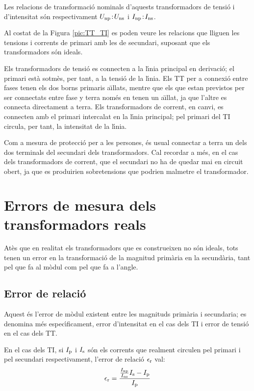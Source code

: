 Les relacions de transformaci\'{o} nominals d'aquests transformadors de
tensi\'{o} i d'intensitat s\'{o}n respectivament $U_\mathrm{np}\!:\!U_\mathrm{ns}$ i
$I_\mathrm{np}\!:\!I_\mathrm{ns}$.

Al costat de la Figura
\vref{pic:TT_TI} es poden veure les relacions que lliguen les
tensions i corrents de primari amb les de secundari, suposant que
els transformadors s\'{o}n ideals.


Els transformadors de tensi\'{o} es connecten a la l\'{\i}nia principal en
derivaci\'{o}; el  primari est\`{a} sotm\`{e}s, per tant, a la tensi\'{o} de la
l\'{\i}nia. Els TT per a connexi\'{o} entre fases tenen els dos borns
primaris a\"{\i}llats, mentre que els que estan previstos per ser
connectats entre fase y terra nom\'{e}s en tenen un a\"{\i}llat, ja que
l'altre es connecta directament a terra. Els transformadors de
corrent, en canvi, es connecten amb el primari intercalat en la
l\'{\i}nia principal;  pel primari del TI circula, per tant, la
intensitat de la l\'{\i}nia.

 Com a mesura de protecci\'{o} per a les persones, \'{e}s usual
connectar a terra un dels dos terminals del secundari dels
transformadors. Cal recordar a m\'{e}s, en el cas dels transformadors de
corrent, que el secundari no ha de quedar mai en circuit obert, ja
que es produirien sobretensions que podrien malmetre el
transformador.

\section{Errors de mesura dels transformadors reals}

At\`{e}s que en realitat els transformadors que es construeixen no s\'{o}n
ideals, tots tenen un error en la transformaci\'{o} de la magnitud
prim\`{a}ria en la secund\`{a}ria, tant pel que fa al m\`{o}dul com pel que fa
a l'angle.

\subsection{Error de relaci\'{o}}

Aquest \'{e}s l'error de m\`{o}dul existent entre les magnituds prim\`{a}ria i
secundaria; es denomina m\'{e}s espec\'{\i}ficament, error d'intensitat en el
cas dels TI i error de tensi\'{o} en el cas dels TT.

En el cas dels TI, si $I_\mathrm{p}$ i $I_\mathrm{s}$ s\'{o}n els corrents que
realment circulen pel primari i pel secundari respectivament,
l'error de relaci\'{o} $\epsilon_\mathrm{r}$ val:
\begin{equation}
    \epsilon_\mathrm{r} = \frac{\frac{I_\mathrm{np}}{I_\mathrm{ns}} I_\mathrm{s} - I_\mathrm{p}} {I_\mathrm{p}}
\end{equation}

